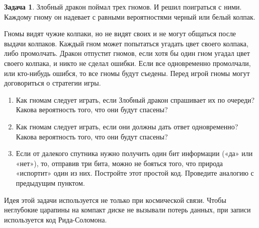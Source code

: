 \documentclass[nobib]{tufte-handout}
\theoremstyle{definition}
\newtheorem{problem}{Задача}
\begin{document}
\begin{problem}
Злобный дракон поймал трех гномов. И решил поиграться с ними. Каждому гному он надевает с равными вероятностями черный или белый колпак.


Гномы видят чужие колпаки, но не видят своих и не могут общаться после выдачи колпаков. Каждый гном может попытаться угадать цвет своего колпака, либо промолчать. Дракон отпустит гномов, если хотя бы один гном угадал цвет своего колпака, и никто не сделал ошибки. Если все одновременно промолчали, или кто-нибудь ошибся, то все гномы будут съедены. Перед игрой гномы могут договориться о стратегии игры.
\begin{enumerate}
\item Как гномам следует играть, если Злобный дракон спрашивает их по очереди? Какова вероятность того, что они будут спасены?
\item Как гномам следует играть, если они должны дать ответ одновременно? Какова вероятность того, что они будут спасены?
\item Если от далекого спутника нужно получить один бит информации («да» или «нет»), то, отправив три бита, можно не бояться того, что природа «испортит» один из них. Постройте этот простой код. Проведите аналогию с предыдущим пунктом. 
\end{enumerate}
Идея этой задачи используется не только при космической связи. Чтобы неглубокие царапины на компакт диске не вызывали потерь данных, при записи используется код Рида-Соломона.

\end{problem}
\end{document}
